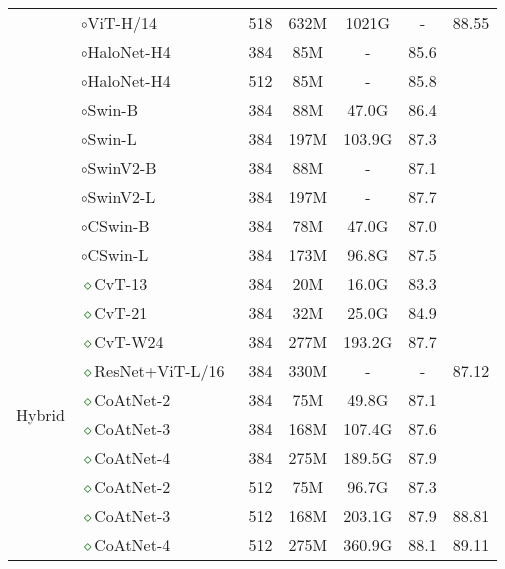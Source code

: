 \documentclass[runningheads]{llncs}
\begin{document}
\begin{table}[!ht]
\begin{tabular}{c|l|ccccc}
& \textcolor{brickred}{$\circ$}ViT-H/14~\cite{dosovitskiy2020image} & 518 & 632M & 1021G &  - & 88.55 \\
&\textcolor{brickred}{$\circ$}HaloNet-H4~\cite{vaswani2021scaling} & 384 & 85M & - & 85.6  \\
&\textcolor{brickred}{$\circ$}HaloNet-H4~\cite{vaswani2021scaling} & 512 & 85M & - & 85.8 \\
&\textcolor{brickred}{$\circ$}Swin-B~\cite{liu2021swin} & 384 & 88M & 47.0G &  86.4 \\
&\textcolor{brickred}{$\circ$}Swin-L~\cite{liu2021swin} & 384 & 197M & 103.9G & 87.3 \\
&\textcolor{brickred}{$\circ$}SwinV2-B~\cite{liu2021swin} & 384 & 88M & - &  87.1 \\
&\textcolor{brickred}{$\circ$}SwinV2-L~\cite{liu2021swin} & 384 & 197M & - &  87.7 \\
&\textcolor{brickred}{$\circ$}CSwin-B~\cite{dong2021cswin} & 384 & 78M & 47.0G &  87.0 \\
&\textcolor{brickred}{$\circ$}CSwin-L~\cite{dong2021cswin} & 384 & 173M & 96.8G &  87.5 \\
\midrule
\multirow{17}{*}{Hybrid} &
\textcolor{darkgreen}{$\diamond$}CvT-13~\cite{wu2021cvt} & 384 & 20M & 16.0G &  83.3 \\
&\textcolor{darkgreen}{$\diamond$}CvT-21~\cite{wu2021cvt} & 384 & 32M & 25.0G &  84.9 \\
&\textcolor{darkgreen}{$\diamond$}CvT-W24~\cite{wu2021cvt} & 384 & 277M & 193.2G &  87.7 \\
&\textcolor{darkgreen}{$\diamond$}ResNet+ViT-L/16~\cite{dosovitskiy2020image} & 384 & 330M & - & - & 87.12 \\
&\textcolor{darkgreen}{$\diamond$}CoAtNet-2~\cite{dai2021coatnet} & 384 & 75M & 49.8G &  87.1 \\
&\textcolor{darkgreen}{$\diamond$}CoAtNet-3~\cite{dai2021coatnet} & 384 & 168M & 107.4G &  87.6 \\
&\textcolor{darkgreen}{$\diamond$}CoAtNet-4~\cite{dai2021coatnet} & 384 & 275M & 189.5G &  87.9 \\
&\textcolor{darkgreen}{$\diamond$}CoAtNet-2~\cite{dai2021coatnet} & 512 & 75M & 96.7G &  87.3 \\
&\textcolor{darkgreen}{$\diamond$}CoAtNet-3~\cite{dai2021coatnet} & 512 & 168M & 203.1G &  87.9 & 88.81 \\
&\textcolor{darkgreen}{$\diamond$}CoAtNet-4~\cite{dai2021coatnet} & 512 & 275M & 360.9G &  88.1 & 89.11 \\

\end{tabular}
\end{table}
\end{document}
